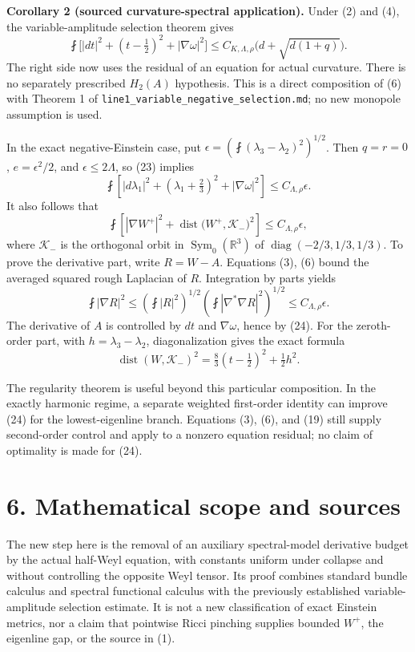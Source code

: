 \documentclass[
  11pt,
]{article}
\begin{document}
\textbf{Corollary 2 (sourced curvature-spectral application).} Under (2)
and (4), the variable-amplitude selection theorem gives \[
 \boxed{\fint\bigl[|dt|^2+(t-\tfrac12)^2+|\nabla\omega|^2\bigr]
    \le C_{K,\Lambda,\rho}\bigl(d+\sqrt{d(1+q)}\bigr).}
 \tag{23}
\] The right side now uses the residual of an equation for actual
curvature. There is no separately prescribed \(H_2(A)\) hypothesis. This
is a direct composition of (6) with Theorem 1 of
\texttt{line1\_variable\_negative\_selection.md}; no new monopole
assumption is used.

In the exact negative-Einstein case, put
\(\epsilon=(\fint(\lambda_3-\lambda_2)^2)^{1/2}\). Then \(q=r=0\),
\(e=\epsilon^2/2\), and \(\epsilon\le2\Lambda\), so (23) implies \[
 \fint\left[|d\lambda_1|^2+(\lambda_1+\tfrac23)^2
                                  +|\nabla\omega|^2\right]
                         \le C_{\Lambda,\rho}\epsilon.
 \tag{24}
\] It also follows that \[
 \fint\left[|\nabla W^+|^2+
       \operatorname{dist}\bigl(W^+,\mathcal K_-\bigr)^2\right]
                         \le C_{\Lambda,\rho}\epsilon,
 \tag{25}
\] where \(\mathcal K_-\) is the orthogonal orbit in
\(\operatorname{Sym}_0(\mathbb R^3)\) of
\(\operatorname{diag}(-2/3,1/3,1/3)\). To prove the derivative part,
write \(R=W-A\). Equations (3), (6) bound the averaged squared rough
Laplacian of \(R\). Integration by parts yields \[
 \fint|\nabla R|^2
       \le\left(\fint|R|^2\right)^{1/2}
          \left(\fint|\nabla^*\nabla R|^2\right)^{1/2}
       \le C_{\Lambda,\rho}\epsilon.
\] The derivative of \(A\) is controlled by \(dt\) and \(\nabla\omega\),
hence by (24). For the zeroth-order part, with
\(h=\lambda_3-\lambda_2\), diagonalization gives the exact formula \[
 \operatorname{dist}(W,\mathcal K_-)^2
        =\tfrac83(t-\tfrac12)^2+\tfrac12h^2.
 \tag{26}
\]

The regularity theorem is useful beyond this particular composition. In
the exactly harmonic regime, a separate weighted first-order identity
can improve (24) for the lowest-eigenline branch. Equations (3), (6),
and (19) still supply second-order control and apply to a nonzero
equation residual; no claim of optimality is made for (24).

\hypertarget{mathematical-scope-and-sources}{%
\section{6. Mathematical scope and
sources}\label{mathematical-scope-and-sources}}

The new step here is the removal of an auxiliary spectral-model
derivative budget by the actual half-Weyl equation, with constants
uniform under collapse and without controlling the opposite Weyl tensor.
Its proof combines standard bundle calculus and spectral functional
calculus with the previously established variable-amplitude selection
estimate. It is not a new classification of exact Einstein metrics, nor
a claim that pointwise Ricci pinching supplies bounded \(W^+\), the
eigenline gap, or the source in (1).
\end{document}
